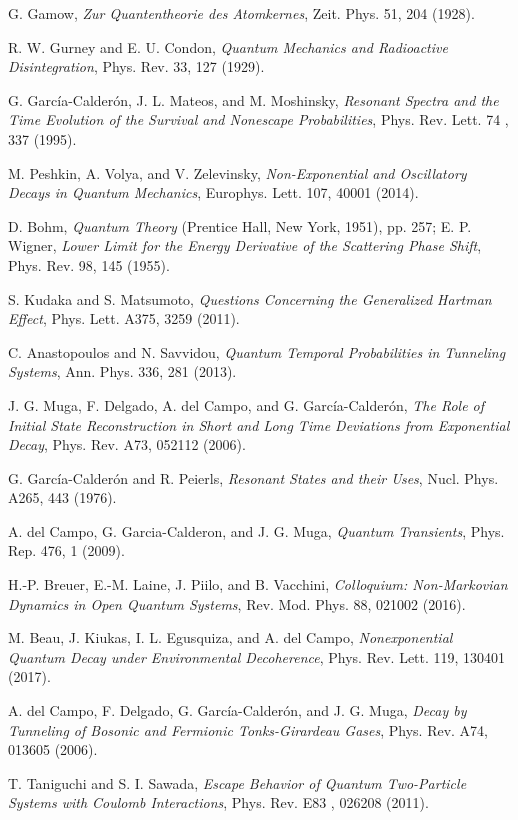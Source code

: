\documentclass[12pt]{article}
\numberwithin{equation}{section}
\begin{document}
\begin{thebibliography}{}
  G. Gamow, {\em Zur Quantentheorie des Atomkernes},  Zeit.  Phys.  51, 204 (1928).

 R. W. Gurney and E. U. Condon, {\em Quantum Mechanics and Radioactive Disintegration}, Phys. Rev. 33,  127 (1929).

 G. Garc\'ia-Calder\'on, J. L. Mateos, and M. Moshinsky, {\em Resonant Spectra and the Time Evolution of the Survival and Nonescape Probabilities},
Phys. Rev. Lett. 74 , 337 (1995).

  M. Peshkin, A. Volya, and V. Zelevinsky, {\em Non-Exponential and Oscillatory Decays in Quantum Mechanics}, Europhys. Lett. 107, 40001 (2014).

 D. Bohm,
{\em Quantum Theory}
(Prentice Hall, New York, 1951), pp. 257; E. P. Wigner, {\em Lower Limit for the Energy Derivative of the Scattering Phase Shift}, Phys.
Rev. 98, 145 (1955).

 S. Kudaka and S. Matsumoto, {\em  Questions Concerning the Generalized Hartman Eﬀect}, Phys. Lett. A375, 3259 (2011).

    C. Anastopoulos and N. Savvidou, {\em Quantum Temporal Probabilities in Tunneling Systems}, Ann. Phys. 336, 281 (2013).

 J. G. Muga, F. Delgado, A. del Campo, and  G. Garc\'ia-Calder\'on, {\em The Role of Initial State Reconstruction in Short and Long Time Deviations from Exponential Decay}, Phys. Rev. A73, 052112 (2006).


 G. Garc\'ia-Calder\'on and R. Peierls, {\em Resonant States and their Uses}, Nucl. Phys. A265, 443 (1976).

 A. del Campo, G. Garcia-Calderon, and J. G. Muga, {\em Quantum Transients}, Phys. Rep. 476, 1 (2009).


      H.-P. Breuer, E.-M. Laine, J. Piilo, and B. Vacchini, {\em Colloquium: Non-Markovian Dynamics in Open Quantum Systems}, Rev. Mod. Phys. 88, 021002 (2016).

 M. Beau, J. Kiukas, I. L. Egusquiza, and A. del Campo, {\em Nonexponential Quantum Decay under Environmental Decoherence}, Phys. Rev. Lett. 119, 130401 (2017).


 A. del Campo, F. Delgado, G. García-Calderón, and J. G. Muga, {\em Decay by Tunneling of Bosonic and Fermionic Tonks-Girardeau Gases}, Phys. Rev. A74, 013605 (2006).

 T. Taniguchi and S. I. Sawada, {\em Escape Behavior of Quantum Two-Particle Systems with Coulomb Interactions}, Phys. Rev. E83 , 026208 (2011).


\end{thebibliography}
\end{document}
